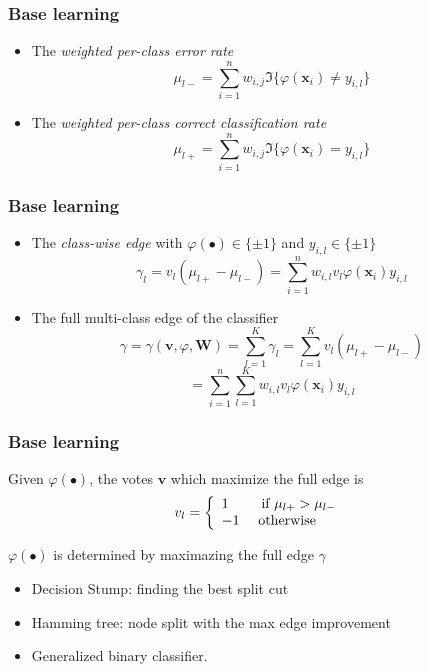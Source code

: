 \documentclass{beamer}
\begin{document}
\begin{frame}
\frametitle{Base learning}
\begin{itemize}
\item The \textit{weighted per-class error rate}
$$\mu_{l-} = \sum_{i=1}^{n}w_{i,j}\mathfrak{I}\{\varphi(\mathbf{x}_i) \neq y_{i,l}\}$$
\item The \textit{weighted per-class correct classification rate}
$$\mu_{l+} = \sum_{i=1}^{n}w_{i,j}\mathfrak{I}\{\varphi(\mathbf{x}_i) = y_{i,l}\}$$
\end{itemize}
\end{frame}

\begin{frame}
\frametitle{Base learning}
\begin{itemize}
\item The \textit{class-wise edge} with $\varphi(\bullet) \in \{\pm 1\}$ and $y_{i,l} \in \{\pm 1\}$
$$\gamma_l = v_l (\mu_{l+} - \mu_{l-}) = \sum_{i=1}^{n} w_{i,l} v_l \varphi(\mathbf{x}_i) y_{i,l}$$
\item The full multi-class edge of the classifier
$$\gamma = \gamma(\mathbf{v}, \varphi, \mathbf{W}) = \sum_{l=1}^{K} \gamma_l = \sum_{l=1}^{K} v_l(\mu_{l+} - \mu_{l-})$$
$$= \sum_{i=1}^{n} \sum_{l=1}^{K} w_{i,l} v_l \varphi(\mathbf{x}_i) y_{i,l} $$
\end{itemize}
\end{frame}

\begin{frame}
\frametitle{Base learning}
\begin{block}{Given $\varphi(\bullet)$, the votes $\mathbf{v}$}
which maximize the full edge is
\[v_l = \left\{
  \begin{array}{l l}
  1 \quad \quad \text{   if } \mu_{l+} > \mu_{l-} \\
  -1 \quad \text{ otherwise }
  \end{array} \right. \]
\end{block}
\begin{block}{$\varphi(\bullet)$ is determined by maximazing the full edge $\gamma$}
\begin{itemize}
\item Decision Stump: finding the best split cut
\item Hamming tree: node split with the max edge improvement
\item Generalized binary classifier.
\end{itemize}
\end{block}
\end{frame}
\end{document}

